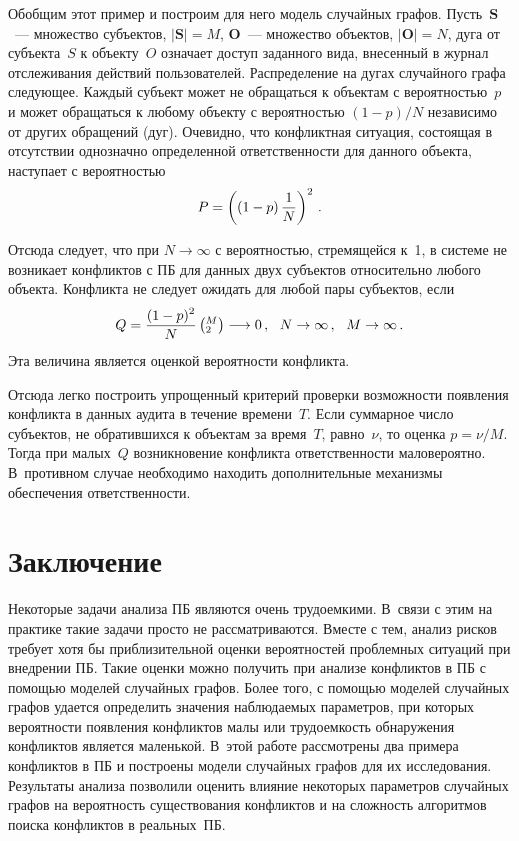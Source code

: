 \begin{multicols}{2}
Обобщим этот пример и построим для него модель случайных графов.
Пусть~$\textbf{S}$~--- множество субъектов,
$\left|\mathbf{S}\right|=M$, $\mathbf{O}$~--- множество объектов,
$\left|\mathbf{O}\right|=N$, дуга от субъекта~$S$ к объекту~$O$
означает доступ заданного вида, внесенный в журнал отслеживания
действий пользователей. Распределение на дугах случайного графа
следующее. Каждый субъект может не обращаться к объектам с
вероятностью~$p$ и может обращаться к любому объекту с вероятностью
$(1-p)/N$ независимо от других обращений (дуг). Очевидно, что
конфликтная ситуация, состоящая в отсутствии однозначно определенной
ответственности для данного объекта, наступает с вероятностью
$$
P=\left(\left(1-p\right)\displaystyle\frac{\displaystyle 1\mathstrut}{\displaystyle N\mathstrut}\right)^{2}\,.
$$

Отсюда следует, что при $N\rightarrow \infty$ с вероятностью,
стремящейся к~1, в системе не возникает конфликтов с ПБ для данных
двух субъектов относительно любого объекта. Конфликта не следует
ожидать для любой пары субъектов, если
$$
Q=\displaystyle\frac{\displaystyle (1-p)^{2}\mathstrut}{\displaystyle N\mathstrut}\left(^{M}_{2}\right) \longrightarrow 0\,,\ \   N\rightarrow \infty\,,\ \  M\rightarrow \infty\,.
$$
Эта величина является оценкой вероятности конфликта.

Отсюда легко построить упрощенный критерий проверки возможности появления конфликта в данных аудита в течение 
времени~$T$. Если суммарное число субъектов, не обратившихся к объектам за время~$T$, равно~$\nu$, то оценка 
$p={\nu}/{M}$. Тогда при малых~$Q$ возникновение конфликта от\-вет\-ст\-вен\-ности маловероятно. 
В~противном случае необходимо находить дополнительные механизмы обеспечения ответственности.

\section{Заключение}

Некоторые задачи анализа ПБ являются очень трудоемкими. В~связи с
этим на практике такие задачи просто не рассматриваются. Вместе с
тем, анализ рисков требует хотя бы приблизительной оценки
вероятностей проблемных ситуаций при внедрении ПБ. Такие оценки
можно получить при анализе конфликтов в ПБ с помощью моделей
случайных графов. Более того, с помощью моделей случайных графов
удается определить значения наблюдаемых параметров, при которых
вероятности появления конфликтов малы или трудоемкость обнаружения
конфликтов является маленькой. В~этой работе рассмотрены два примера
конфликтов в ПБ и построены модели случайных графов для их
исследования. Результаты анализа позволили оценить влияние некоторых
параметров случайных графов на вероятность существования конфликтов
и на сложность алгоритмов поиска конфликтов в реальных~ПБ.



\end{multicols}
